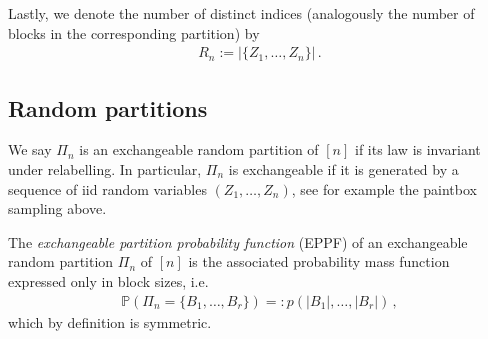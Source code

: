 \documentclass[a4paper,11pt]{article}
\newcommand{\NN}{\mathbf{N}}
\newcommand{\PP}{\mathbb{P}}
\numberwithin{equation}{section}
\newtheorem{example}{Example}
\begin{document}
Lastly, we denote the number of distinct indices (analogously the number of blocks in the corresponding partition) by 
\begin{equation*}
\begin{aligned}
R_{n} := |\{ Z_{1}, \ldots, Z_{n}\}|\,.
\end{aligned}
\end{equation*}


\subsection{Random partitions}


We say $ \Pi_{n}$ is an exchangeable random partition of $[n]$ if its law is invariant under relabelling. In particular, $ \Pi_{n}$ is exchangeable if it is generated by a  sequence of iid random variables $ (Z_{1}, \ldots, Z_{n})$, see for example the paintbox sampling above.







The \emph{exchangeable partition probability function} (EPPF) of an exchangeable random partition $ \Pi_{n}$ of $[n]$ is the associated probability mass function expressed only in block sizes, i.e.
\begin{equation}\label{eq_eppf}
\begin{aligned}
\PP( \Pi_{n}= \{B_{1}, \ldots, B_{r}\})=: p ( |B_{1}|, \ldots ,|B_{r}|)\,,
\end{aligned}
\end{equation}
which by definition is symmetric.
\end{document}
